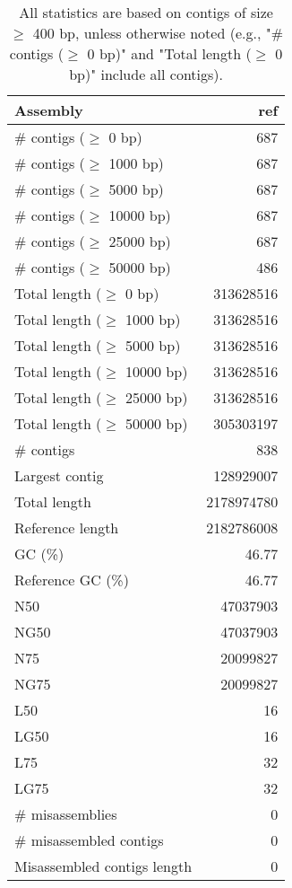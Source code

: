 \documentclass[12pt,a4paper]{article}
\begin{document}
\begin{table}[ht]
\begin{center}
\caption{All statistics are based on contigs of size $\geq$ 400 bp, unless otherwise noted (e.g., "\# contigs ($\geq$ 0 bp)" and "Total length ($\geq$ 0 bp)" include all contigs).}
\begin{tabular}{|l*{1}{|r}|}
\hline
Assembly & ref \\ \hline
\# contigs ($\geq$ 0 bp) & 687 \\ \hline
\# contigs ($\geq$ 1000 bp) & 687 \\ \hline
\# contigs ($\geq$ 5000 bp) & 687 \\ \hline
\# contigs ($\geq$ 10000 bp) & 687 \\ \hline
\# contigs ($\geq$ 25000 bp) & 687 \\ \hline
\# contigs ($\geq$ 50000 bp) & 486 \\ \hline
Total length ($\geq$ 0 bp) & 313628516 \\ \hline
Total length ($\geq$ 1000 bp) & 313628516 \\ \hline
Total length ($\geq$ 5000 bp) & 313628516 \\ \hline
Total length ($\geq$ 10000 bp) & 313628516 \\ \hline
Total length ($\geq$ 25000 bp) & 313628516 \\ \hline
Total length ($\geq$ 50000 bp) & 305303197 \\ \hline
\# contigs & 838 \\ \hline
Largest contig & 128929007 \\ \hline
Total length & 2178974780 \\ \hline
Reference length & 2182786008 \\ \hline
GC (\%) & 46.77 \\ \hline
Reference GC (\%) & 46.77 \\ \hline
N50 & 47037903 \\ \hline
NG50 & 47037903 \\ \hline
N75 & 20099827 \\ \hline
NG75 & 20099827 \\ \hline
L50 & 16 \\ \hline
LG50 & 16 \\ \hline
L75 & 32 \\ \hline
LG75 & 32 \\ \hline
\# misassemblies & 0 \\ \hline
\# misassembled contigs & 0 \\ \hline
Misassembled contigs length & 0 \\ \hline

\end{tabular}
\end{center}
\end{table}
\end{document}
